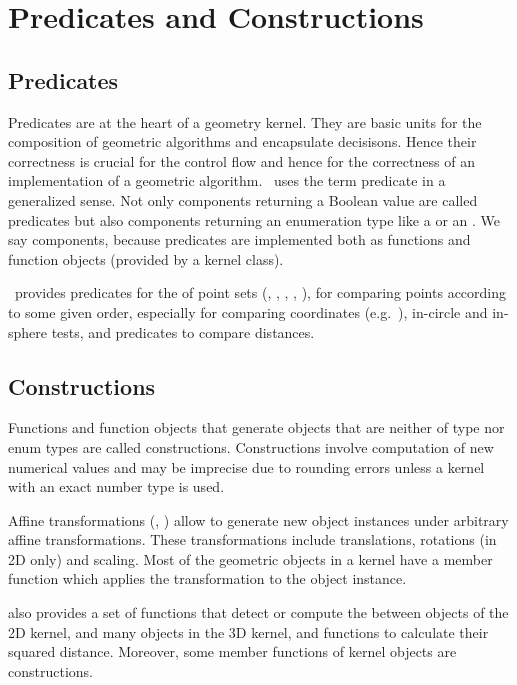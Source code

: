 \section{Predicates and Constructions}

\subsection{Predicates}
Predicates are at the heart of a geometry kernel. They are basic units
for the composition of geometric algorithms and encapsulate decisisons. 
Hence their correctness is crucial for the control flow and hence for
the correctness of an implementation of a geometric algorithm. \cgal\ uses
the term predicate in a generalized sense. Not only components returning a
Boolean value are called predicates but also components returning an 
enumeration type like a  or an .
We say components, because predicates are implemented both as functions and 
function objects (provided by a kernel class).

\cgal\ provides predicates for the  of point 
sets (, , , ,
), for comparing points according to some given order, 
especially for comparing  coordinates
(e.g.~), in-circle and in-sphere tests,
and predicates to compare distances.

\subsection{Constructions}
Functions and function objects that generate objects that are neither 
of type  nor enum types are called constructions.
Constructions involve computation of new numerical values and may be
imprecise due to rounding errors unless a kernel with an exact number type is 
used.

Affine transformations (, 
) allow to generate new object instances under
arbitrary affine transformations. These transformations include translations,
rotations (in 2D only) and scaling. Most of the geometric objects in a
kernel have a member function  
which applies the transformation to the object instance.

{\cgal} also provides a set of functions that detect or compute the 
between objects of the 2D kernel, and many objects in the 3D kernel,
and functions to calculate their 
squared distance.
Moreover, some member functions of kernel objects are constructions. 

